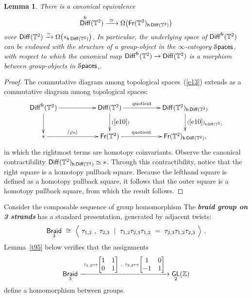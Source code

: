 \documentclass{amsart}
\newtheorem{lemma}[theorem]{Lemma}
\theoremstyle{definition}
\theoremstyle{remark}
\DeclareMathOperator{\Diff}{{\sf Diff}}
\DeclareMathOperator{\Spaces}{\cS\mathsf{paces}}
\DeclareMathOperator{\fr}{\sf fr}
\newcommand{\lag}{\langle}
\newcommand{\rag}{\rangle}
\newcommand{\xra}{\xrightarrow}
\DeclareMathOperator{\Braid}{\sf Braid}
\DeclareMathOperator{\GL}{\sf GL}
\DeclareMathOperator{\Fr}{\sf Fr}
\begin{document}

\begin{lemma}\label{t3}
There is a canonical equivalence
\[
\Diff^{\fr}(\TT^2)
\xra{~\simeq~}
\Omega \bigl( \Fr(\TT^2)_{{\sf h} \Diff(\TT^2)} \bigr)
\]
over $\Diff(\TT^2) \xra{\simeq}  \Omega \bigl( \ast_{{\sf h} \Diff(\TT^2)} \bigr)$.
In particular, the underlying space of $\Diff^{\fr}(\TT^2)$ can be endowed with the structure of a group-object in the $\infty$-category $\Spaces$, with respect to which the canonical map $\Diff^{\fr}(\TT^2) \to \Diff(\TT^2)$ is a morphism between group-objects in $\Spaces$,.
\end{lemma}


\begin{proof}
The commutative diagram among topological spaces~(\ref{e13}) extends as a commutative diagram among topological spaces:
\begin{equation}\label{e18}
\xymatrix{
\Diff^{\fr}(\TT^2) \ar[rr] \ar[d]
&&
\Diff(\TT^2) \ar[d]^-{(\ref{e10})} \ar[rr]^-{\rm quotient}
&&
\Diff(\TT^2)_{{\sf h}\Diff(\TT^2)} \ar[d]^-{(\ref{e10})_{{\sf h}\Diff(\TT^2)}}
\\
\ast \ar[rr]^-{\lag \varphi_0\rag}
&&
\Fr(\TT^2)
\ar[rr]^-{\rm quotient}
&&
\Fr(\TT^2)_{{\sf h}\Diff(\TT^2)}
,
}
\end{equation}
in which the rightmost terms are homotopy coinvariants.  
Observe the canonical contractibility $\Diff(\TT^2)_{{\sf h}\Diff(\TT^2)}\simeq\ast$.
Through this contractibility, notice that the right square is a homotopy pullback square.  
Because the lefthand square is defined as a homotopy pullback square, it follows that the outer square is a homotopy pullback square, from which the result follows.
\end{proof}



Consider the composable sequence of group homomorphism 
The \textit{\textbf{braid group on 3 strands}} has a standard presentation, generated by adjacent twists:
\begin{equation}\label{e15}
\Braid_3 
~\cong~
\Bigl \lag~ \tau_{1,2}~,~ \tau_{2,3}~ \mid ~ \tau_{1,2}\tau_{2,3}\tau_{1,2} ~=~ \tau_{2,3} \tau_{1,2} \tau_{2,3} ~\Bigr\rag
~.
\end{equation}
Lemma~\ref{t95} below verifies that the assignments
\begin{equation}
\label{e1}
\Braid_3
\xra{~\tau_{1,2} \mapsto \begin{bmatrix} 1 & 1 \\ 0 & 1 \end{bmatrix}~,~\tau_{2,3}\mapsto \begin{bmatrix} 1 & 0 \\ -1 & 1 \end{bmatrix} ~}
\GL_2(\ZZ)
\end{equation}
define a homomorphism between groups.
\end{document}
